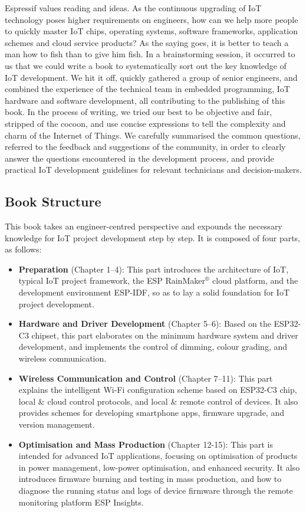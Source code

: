 \documentclass[a4paper,12pt,openany]{book}
\begin{document}
Espressif values reading and ideas. As the continuous upgrading of IoT technology poses higher requirements on engineers, how can we help more people to quickly master IoT chips, operating systems, software frameworks, application schemes and cloud service products? As the saying goes, it is better to teach a man how to fish than to give him fish. In a brainstorming session, it occurred to us that we could write a book to systematically sort out the key knowledge of IoT development. We hit it off, quickly gathered a group of senior engineers, and combined the experience of the technical team in embedded programming, IoT hardware and software development, all contributing to the publishing of this book. In the process of writing, we tried our best to be objective and fair, stripped of the cocoon, and use concise expressions to tell the complexity and charm of the Internet of Things. We carefully summarised the common questions, referred to the feedback and suggestions of the community, in order to clearly answer the questions encountered in the development process, and provide practical IoT development guidelines for relevant technicians and decision-makers.

\subsection*{Book Structure}
This book takes an engineer-centred perspective and expounds the necessary knowledge for IoT project development step by step. It is composed of four parts, as follows:
\begin{itemize}
    \item \textbf{Preparation} (Chapter 1–4): This part introduces the architecture of IoT, typical IoT project framework, the ESP RainMaker$^\circledR$ cloud platform, and the development environment ESP-IDF, so as to lay a solid foundation for IoT project development.
    \item \textbf{Hardware and Driver Development} (Chapter 5–6): Based on the ESP32-C3 chipset, this part elaborates on the minimum hardware system and driver development, and implements the control of dimming, colour grading, and wireless communication.
    \item \textbf{Wireless Communication and Control} (Chapter 7–11): This part explains the intelligent Wi-Fi configuration scheme based on ESP32-C3 chip, local \& cloud control protocols, and local \& remote control of devices. It also provides schemes for developing smartphone apps, firmware upgrade, and version management.
    \item \textbf{Optimisation and Mass Production} (Chapter 12-15): This part is intended for advanced IoT applications, focusing on optimisation of products in power management, low-power optimisation, and enhanced security. It also introduces firmware burning and testing in mass production, and how to diagnose the running status and logs of device firmware through the remote monitoring platform ESP Insights.
\end{itemize}
\end{document}

